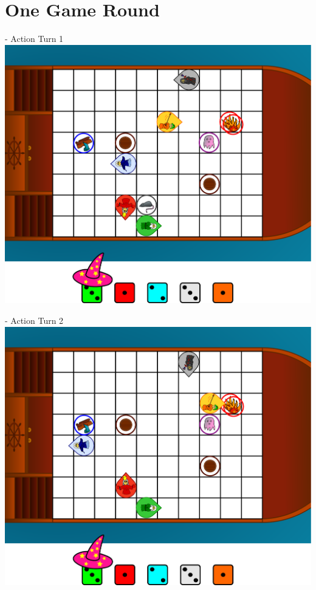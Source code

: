 \documentclass[presentation]{beamer}
\begin{document}
\section{One Game Round}

\begin{frame}{\insertsection - Action Turn 1}
	\center
	\includegraphics[width=\textheight]{ingame_sketch_1.pdf}
\end{frame}

\begin{frame}{\insertsection - Action Turn 2}
	\center
	\includegraphics[width=\textheight]{ingame_sketch_2.pdf}
\end{frame}
\end{document}
